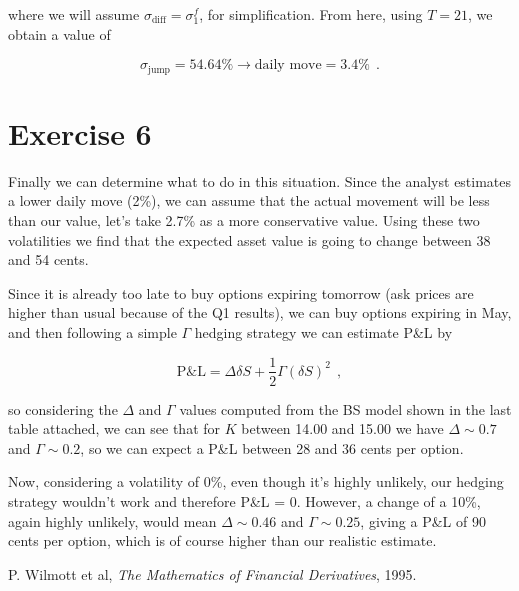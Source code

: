 \documentclass[8 pt]{article}
\begin{document}
\begin{multicols*}{2}
where we will assume $\sigma_{\text{diff}} = \sigma_1^f$, for simplification. From here, using $T=21$, we obtain a value of

\begin{equation*}
  \sigma_{\text{jump}} = 54.64 \% \longrightarrow \text{daily move} = 3.4 \% ~~.
\end{equation*}

\section{Exercise 6}

Finally we can determine what to do in this situation. Since the analyst estimates a lower daily move (2\%), we can assume that the actual movement will be less than our value, let's take 2.7\% as a more conservative value. Using these two volatilities we find that the expected asset value is going to change between 38 and 54 cents.

Since it is already too late to buy options expiring tomorrow (ask prices are higher than usual because of the Q1 results), we can buy options expiring in May, and then following a simple $\Gamma$ hedging strategy we can estimate P\&L by

\begin{equation*}
  \text{P\&L} = \Delta \delta S + \frac{1}{2}\Gamma (\delta S)^2 ~~,
\end{equation*}

so considering the $\Delta$ and $\Gamma$ values computed from the BS model shown in the last table attached, we can see that for $K$ between 14.00 and 15.00 we have $\Delta \sim 0.7$ and $\Gamma \sim 0.2$, so we can expect a P\&L between 28 and 36 cents per option.

Now, considering a volatility of 0\%, even though it's highly unlikely, our hedging strategy wouldn't work and therefore P\&L = 0. However, a change of a 10\%, again highly unlikely, would mean $\Delta \sim 0.46$ and $\Gamma \sim 0.25$, giving a P\&L of 90 cents per option, which is of course higher than our realistic estimate.

\begin{thebibliography}{1}
\raggedright
{}

 P. Wilmott et al, \emph{The Mathematics of Financial Derivatives}, 1995.

\end{thebibliography}

\end{multicols*}



\end{document}
